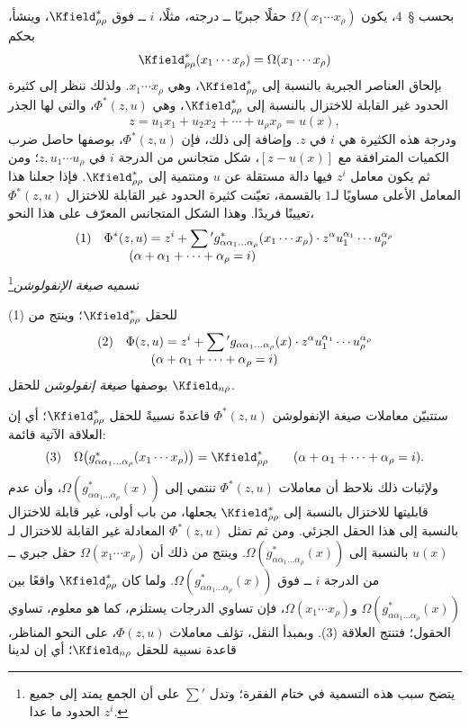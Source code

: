 \documentclass[11pt]{article}
\newcommand{\srcLTR}[1]{\relax\ifmmode\text{\mbox{\babelsublr{\foreignlanguage{english}{#1}}}}\else\babelsublr{\foreignlanguage{english}{#1}}\fi}
\newcommand{\srcfn}[2]{\begingroup\renewcommand{\thefootnote}{\srcLTR{#1}}\footnote{#2}\addtocounter{footnote}{-1}\endgroup}
\begin{document}
بحسب \S\ 4، يكون $\Omega(x_1\cdots x_\rho)$ حقلًا جبريًا ــ درجته، مثلًا، $i$ ــ فوق $\Kfield^*_{\rho\rho}$، وينشأ، بحكم
\[
\Kfield^*_{\rho\rho}(x_1\cdots x_\rho)=\Omega(x_1\cdots x_\rho)
\]
بإلحاق العناصر الجبرية بالنسبة إلى $\Kfield^*_{\rho\rho}$، وهي $x_1\cdots x_\rho$. ولذلك ننظر إلى كثيرة الحدود غير القابلة للاختزال بالنسبة إلى $\Kfield^*_{\rho\rho}$، وهي $\Phi^*(z,u)$، والتي لها الجذر
\[
z=u_1x_1+u_2x_2+\cdots+u_\rho x_\rho=u(x),
\]
ودرجة هذه الكثيرة هي $i$ في $z$. وإضافة إلى ذلك، فإن $\Phi^*(z,u)$، بوصفها حاصل ضرب الكميات المترافقة مع $[z-u(x)]$، شكل متجانس من الدرجة $i$ في $z,u_1\cdots u_\rho$؛ ومن ثم يكون معامل $z^i$ فيها دالة مستقلة عن $u$ ومنتمية إلى $\Kfield^*_{\rho\rho}$. فإذا جعلنا هذا المعامل الأعلى مساويًا لـ$1$ بالقسمة، تعيّنت كثيرة الحدود غير القابلة للاختزال $\Phi^*(z,u)$ تعيينًا فريدًا. وهذا الشكل المتجانس المعرّف على هذا النحو،
\[
\begin{array}{@{}l@{\quad}l@{}}
(1)& \displaystyle \Phi^*(z,u)=z^i+\sum{}'g^*_{\alpha\alpha_1\ldots\alpha_\rho}(x_1\cdots x_\rho)\cdot
z^\alpha u_1^{\alpha_1}\cdots u_\rho^{\alpha_\rho}\\
& \displaystyle\qquad(\alpha+\alpha_1+\cdots+\alpha_\rho=i)
\end{array}
\]
نسميه \emph{صيغة الإنفولوشن}\srcfn{*)}{يتضح سبب هذه التسمية في ختام الفقرة؛ وتدل $\sum'$ على أن الجمع يمتد إلى جميع الحدود ما عدا $z^i$.} للحقل $\Kfield^*_{\rho\rho}$؛ وينتج من (1)
\[
\begin{array}{@{}l@{\quad}l@{}}
(2)& \displaystyle \Phi(z,u)=z^i+\sum{}'g_{\alpha\alpha_1\ldots\alpha_\rho}(x)\cdot
z^\alpha u_1^{\alpha_1}\cdots u_\rho^{\alpha_\rho}\\
& \displaystyle\qquad(\alpha+\alpha_1+\cdots+\alpha_\rho=i)
\end{array}
\]
بوصفها \emph{صيغة إنفولوشن} للحقل $\Kfield_{n\rho}$.



ستتبيّن معاملات صيغة الإنفولوشن $\Phi^*(z,u)$ قاعدةً نسبيةً للحقل $\Kfield^*_{\rho\rho}$؛ أي إن العلاقة الآتية قائمة:
\[
\begin{array}{@{}l@{\quad}c@{}}
(3)& \Omega\bigl(g^*_{\alpha\alpha_1\ldots\alpha_\rho}(x_1\cdots x_\rho)\bigr)=\Kfield^*_{\rho\rho}\qquad(\alpha+\alpha_1+\cdots+\alpha_\rho=i).
\end{array}
\]
ولإثبات ذلك نلاحظ أن معاملات $\Phi^*(z,u)$ تنتمي إلى $\Omega(g^*_{\alpha\alpha_1\ldots\alpha_\rho}(x))$، وأن عدم قابليتها للاختزال بالنسبة إلى $\Kfield^*_{\rho\rho}$ يجعلها، من باب أولى، غير قابلة للاختزال بالنسبة إلى هذا الحقل الجزئي. ومن ثم تمثل $\Phi^*(z,u)$ المعادلة غير القابلة للاختزال لـ$u(x)$ بالنسبة إلى $\Omega(g^*_{\alpha\alpha_1\ldots\alpha_\rho}(x))$. وينتج من ذلك أن $\Omega(x_1\cdots x_\rho)$ حقل جبري ــ من الدرجة $i$ ــ فوق $\Omega(g^*_{\alpha\alpha_1\ldots\alpha_\rho}(x))$. ولما كان $\Kfield^*_{\rho\rho}$ واقعًا بين $\Omega(g^*_{\alpha\alpha_1\ldots\alpha_\rho}(x))$ و$\Omega(x_1\cdots x_\rho)$، فإن تساوي الدرجات يستلزم، كما هو معلوم، تساوي الحقول؛ فتنتج العلاقة (3). وبمبدأ النقل، تؤلف معاملات $\Phi(z,u)$، على النحو المناظر، قاعدة نسبية للحقل $\Kfield_{n\rho}$؛ أي إن لدينا
\end{document}
